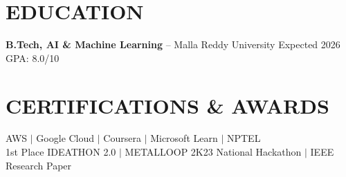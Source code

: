 \documentclass[10pt]{article}
\begin{document}
\section*{EDUCATION}
\textbf{B.Tech, AI \& Machine Learning} -- Malla Reddy University \hfill Expected 2026 \hfill GPA: 8.0/10

\section*{CERTIFICATIONS \& AWARDS}
AWS $|$ Google Cloud $|$ Coursera $|$ Microsoft Learn $|$ NPTEL \\
1st Place IDEATHON 2.0 $|$ METALLOOP 2K23 National Hackathon $|$ IEEE Research Paper
\end{document}
